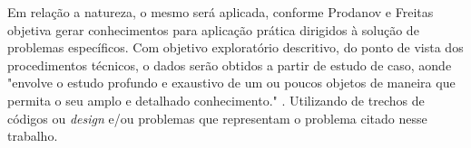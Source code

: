 \documentclass[12pt]{article}
\begin{document}
Em relação a natureza, o mesmo será aplicada, conforme Prodanov e Freitas \cite{METOLOGIA} objetiva gerar conhecimentos para aplicação prática dirigidos à solução de problemas específicos. Com objetivo exploratório descritivo, do ponto de vista dos procedimentos técnicos, o dados serão obtidos a partir de estudo de caso, aonde "envolve  o  estudo  profundo  e  exaustivo  de  um  ou  poucos  objetos  de  maneira  que  permita  o  seu  amplo  e  detalhado  conhecimento." \cite{METOLOGIA}. Utilizando de trechos de códigos ou \textit{design} e/ou problemas que representam o problema citado nesse trabalho.









\end{document}
